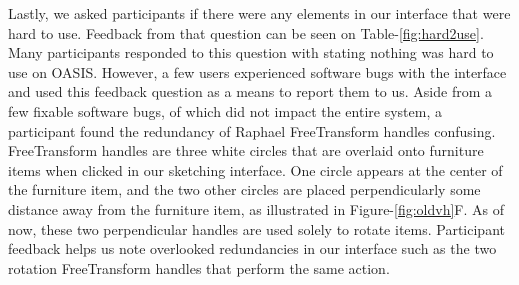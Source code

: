 Lastly, we asked participants if there were any elements in our interface that were hard to use.  Feedback from that question can be seen on Table-\ref{fig:hard2use}.  Many participants responded to this question with stating nothing was hard to use on OASIS.  However, a few users experienced software bugs with the interface and used this feedback question as a means to report them to us.  Aside from a few fixable software bugs, of which did not impact the entire system, a participant found the redundancy of Raphael FreeTransform handles confusing.  FreeTransform handles are three white circles that are overlaid onto furniture items when clicked in our sketching interface.  One circle appears at the center of the furniture item, and the two other circles are placed perpendicularly some distance away from the furniture item, as illustrated in Figure-\ref{fig:oldvh}F.  As of now, these two perpendicular handles are used solely to rotate items.  Participant feedback helps us note overlooked redundancies in our interface such as the two rotation FreeTransform handles that perform the same action.\\ 

